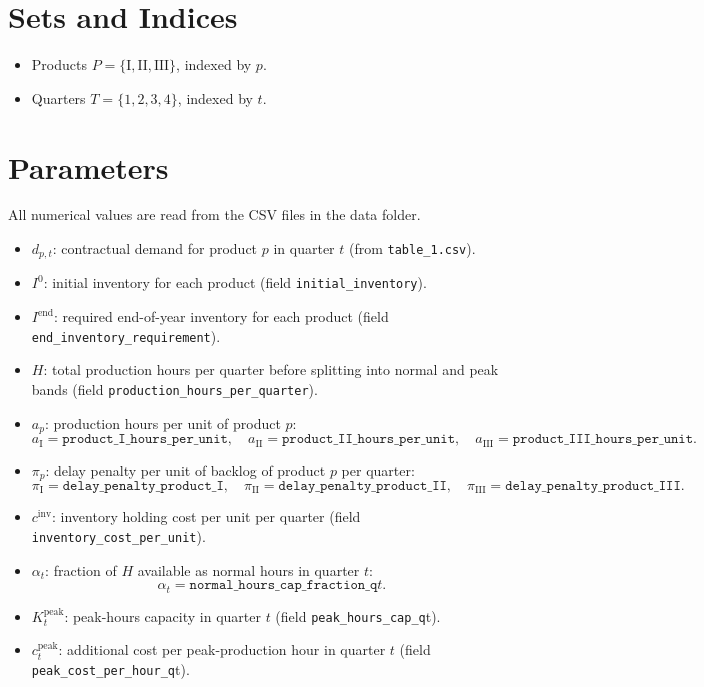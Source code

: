\section*{Sets and Indices}

\begin{itemize}
    \item Products \(P=\{\text{I},\text{II},\text{III}\}\), indexed by \(p\).
    \item Quarters \(T=\{1,2,3,4\}\), indexed by \(t\).
\end{itemize}

\section*{Parameters}

All numerical values are read from the CSV files in the data folder.

\begin{itemize}
    \item \(d_{p,t}\): contractual demand for product \(p\) in quarter \(t\) (from \texttt{table\_1.csv}).
    \item \(I^0\): initial inventory for each product (field \texttt{initial\_inventory}).
    \item \(I^{\mathrm{end}}\): required end-of-year inventory for each product (field \texttt{end\_inventory\_requirement}).
    \item \(H\): total production hours per quarter before splitting into normal and peak bands (field \texttt{production\_hours\_per\_quarter}).
    \item \(a_p\): production hours per unit of product \(p\):
    \[
    a_{\text{I}}=\texttt{product\_I\_hours\_per\_unit},\quad
    a_{\text{II}}=\texttt{product\_II\_hours\_per\_unit},\quad
    a_{\text{III}}=\texttt{product\_III\_hours\_per\_unit}.
    \]
    \item \(\pi_p\): delay penalty per unit of backlog of product \(p\) per quarter:
    \[
    \pi_{\text{I}}=\texttt{delay\_penalty\_product\_I},\quad
    \pi_{\text{II}}=\texttt{delay\_penalty\_product\_II},\quad
    \pi_{\text{III}}=\texttt{delay\_penalty\_product\_III}.
    \]
    \item \(c^{\mathrm{inv}}\): inventory holding cost per unit per quarter (field \texttt{inventory\_cost\_per\_unit}).
    \item \(\alpha_t\): fraction of \(H\) available as normal hours in quarter \(t\):
    \[
    \alpha_t=\texttt{normal\_hours\_cap\_fraction\_q}t.
    \]
    \item \(K_t^{\mathrm{peak}}\): peak-hours capacity in quarter \(t\) (field \texttt{peak\_hours\_cap\_q}t).
    \item \(c_t^{\mathrm{peak}}\): additional cost per peak-production hour in quarter \(t\) (field \texttt{peak\_cost\_per\_hour\_q}t).
\end{itemize}

